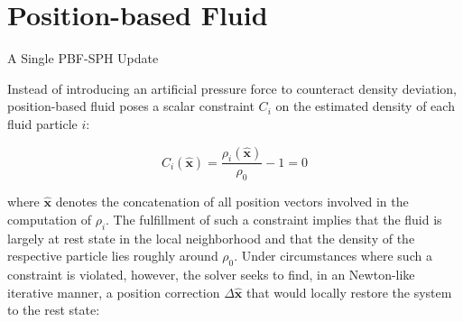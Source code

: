 \documentclass[
	11pt, 
	DIV10,
	ngerman,
	a4paper, 
	oneside, 
	headings=normal, 
	captions=tableheading,
	final, 
	numbers=noenddot
]{scrartcl}
\begin{document}
\section{Position-based Fluid}
\label{sec3}

\large
\begin{algorithm}
	\DontPrintSemicolon
	\SetAlgoLined
	\caption{\label{alg3} A Single PBF-SPH Update}
\end{algorithm}
\normalsize

Instead of introducing an artificial pressure force to counteract density deviation, position-based fluid poses a scalar constraint $ C_{i} $ on the estimated density of each fluid particle $ i $:

\begin{equation}
	\label{eq20}
	C_{i}(\hat{\boldsymbol{x}}) = \frac{\rho_{i}(\hat{\boldsymbol{x}})}{\rho_{0}} - 1 = 0
\end{equation}

where $ \hat{\boldsymbol{x}} $ denotes the concatenation of all position vectors involved in the computation of $ \rho_{i} $. The fulfillment of such a constraint implies that the fluid is largely at rest state in the local neighborhood and that the density of the respective particle lies roughly around $ \rho_{0} $. Under circumstances where such a constraint is violated, however, the solver seeks to find, in an Newton-like iterative manner, a position correction $ \Delta \hat{\boldsymbol{x}} $ that would locally restore the system to the rest state:
\end{document}
